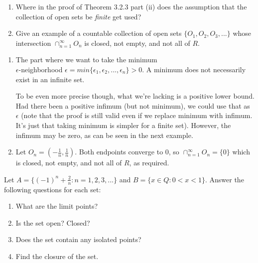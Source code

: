 \documentclass{oxmathproblems}
\begin{document}
\begin{questions}

\miquestion
\begin{enumerate}[label=(\alph*)]
  \item Where in the proof of Theorem 3.2.3 part (ii) does the assumption that the collection of open sets be \textit{finite} get used?
  \item Give an example of a countable collection of open sets $\{O_{1}, O_{2}, O_{3}, ...\}$ whose intersection $\cap_{n=1}^{\infty}O_{n}$ is closed, not empty, and
  not all of $R$.
\end{enumerate}

\begin{solution}
  \begin{enumerate}[label=(\alph*)]
    \item The part where we want to take the minimum \\
    $\epsilon$-neighborhood $\epsilon = min\{\epsilon_{1}, \epsilon_{2}, ..., \epsilon_{n}\} > 0$. A minimum does not necessarily exist in an infinite set.

    To be even more precise though, what we're lacking is a positive lower bound. Had there been a positive infimum (but not minimum), we could use that as $\epsilon$ (note
    that the proof is still valid even if we replace minimum with infimum. It's just that taking minimum is simpler for a finite set). However, the infimum may
    be zero, as can be seen in the next example.

    \item Let $O_{n} = (-\frac{1}{n}, \frac{1}{n})$. Both endpoints converge to 0, so $\cap_{n=1}^{\infty}O_{n} = \{0\}$ which is closed, not empty, and not all of $R$, as required.
  \end{enumerate}
\end{solution}

\miquestion Let $A = \{(-1)^{n} + \frac{2}{n} : n = 1, 2, 3, ...\}$ and $B = \{x \in Q : 0 < x < 1\}$. Answer the following questions for each set:
\begin{enumerate}[label=(\alph*)]
  \item What are the limit points?
  \item Is the set open? Closed?
  \item Does the set contain any isolated points?
  \item Find the closure of the set.
\end{enumerate}


\end{questions}
\end{document}
